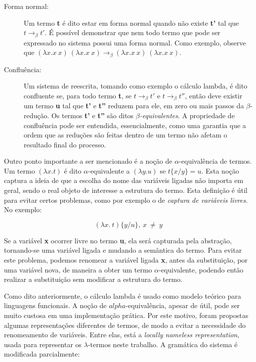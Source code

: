 \begin{description}
    \item[Forma normal:] Um termo \textbf{t} é dito estar em forma
    normal quando não existe \textbf{t'} tal que $ t \rightarrow_\beta t' $. 
    É possível demonstrar que nem todo termo que pode ser expressado no sistema
    possui uma forma normal. Como exemplo, observe que $ (\lambda x.x\ x)\ (\lambda
    x.x\ x) \rightarrow_\beta (\lambda x.x\ x)\ (\lambda x.x\ x) $.

    \item[Confluência:] Um sistema de reescrita, tomando como exemplo o cálculo
    lambda, é dito confluente se, para todo termo \textbf{t}, se $ t
    \rightarrow_\beta t' $ e $ t \rightarrow_\beta t'' $, então deve existir
    um termo \textbf{u} tal que \textbf{t'} e \textbf{t''} reduzem para ele,
    em zero ou mais passos da $\beta$-redução.  Os termos \textbf{t'} e
    \textbf{t''} são ditos \textit{$\beta$-equivalentes}.  A propriedade de
    confluência pode ser entendida, essencialmente, como uma garantia que a
    ordem que as reduções são feitas dentro de um termo não afetam o
    resultado final do processo.

\end{description}

Outro ponto importante a ser mencionado é a noção de $\alpha$-equivalência de
termos. Um termo $(\lambda x. t)$ é dito $\alpha$-equivalente a $(\lambda y. u)$
se $ t\{x/y\} = u $. Esta noção captura a ideia de que a escolha do nome das
variáveis ligadas não importa em geral, sendo o real objeto de interesse a
estrutura do termo. Esta definição é útil para evitar certos problemas, como por
exemplo o de \textit{captura de variáveis livres}. No exemplo:

\[ (\lambda x.\ t)\{y/u\},\ x\ \neq\ y \]

Se a variável \textbf{x} ocorrer livre no termo \textbf{u}, ela será capturada
pela abstração, tornando-se uma variável ligada e mudando a semântica do termo.
Para evitar este problema, podemos renomear a variável ligada \textbf{x}, antes
da substituição, por uma variável nova, de maneira a obter um termo
$\alpha$-equivalente, podendo então realizar a substituição sem modificar a
estrutura do termo.

Como dito anteriormente, o cálculo lambda é usado como modelo teórico para
linguagens funcionais. A noção de $alpha$-equivalência, apesar de útil, pode ser
muito custosa em uma implementação prática. Por este motivo, foram propostas
algumas representações diferentes de termos, de modo a evitar a necessidade do
renomeamento de variáveis. Entre elas, está a \textit{locally nameless
    representation}, usada para representar os $\lambda$-termos neste trabalho.
A gramática do sistema é modificada parcialmente:

